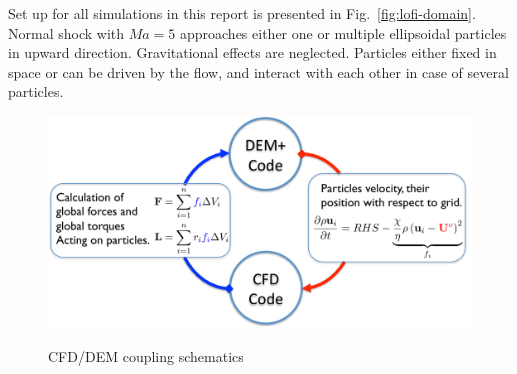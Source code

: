 Set up for all simulations in this report is presented in Fig.~\ref{fig:lofi-domain}. Normal shock with $Ma=5$ approaches either one or multiple ellipsoidal particles in upward direction. Gravitational effects are neglected. Particles either fixed in space or can be driven by the flow, and interact with each other in case of several particles.
\begin{figure}[t!]
\centering \includegraphics[scale=0.5]{fig/coupling.pdf}\\
\caption{CFD/DEM coupling schematics \label{fig:coupling}}
\end{figure}
